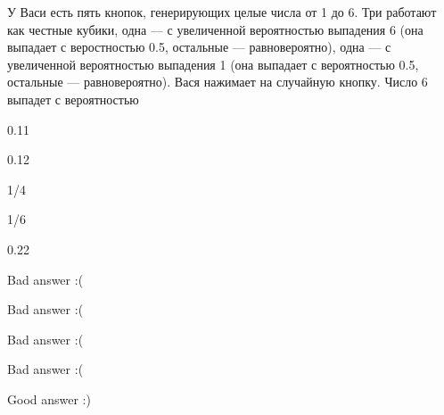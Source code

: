 
\begin{question}
У Васи есть пять кнопок, генерирующих целые числа от 1 до 6. Три
работают как честные кубики, одна --- с увеличенной вероятностью
выпадения 6 (она выпадает с веростностью 0.5, остальные ---
равновероятно), одна --- с увеличенной вероятностью выпадения 1 (она
выпадает с вероятностью 0.5, остальные --- равновероятно). Вася нажимает
на случайную кнопку. Число 6 выпадет с вероятностью
\begin{answerlist}
  \item 0.11
  \item 0.12
  \item 1/4
  \item 1/6
  \item 0.22
\end{answerlist}
\end{question}

\begin{solution}
\begin{answerlist}
  \item Bad answer :(
  \item Bad answer :(
  \item Bad answer :(
  \item Bad answer :(
  \item Good answer :)
\end{answerlist}
\end{solution}

